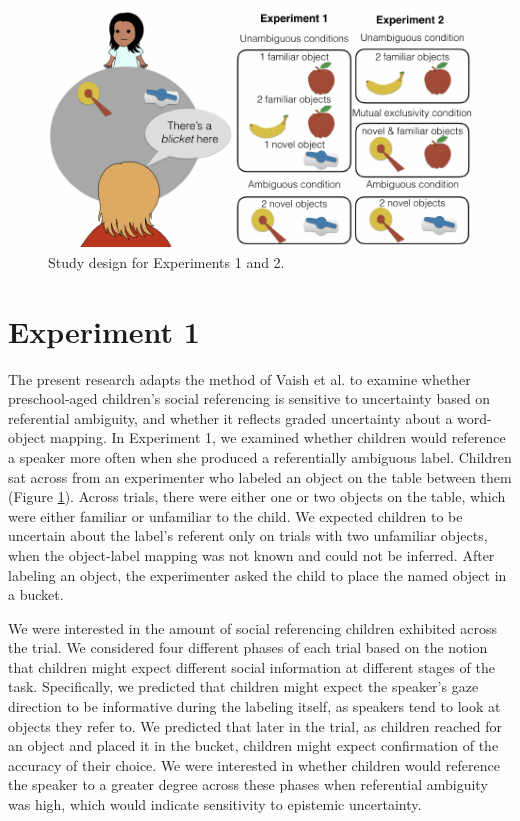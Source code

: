 \documentclass[10pt, letterpaper]{article}
\newenvironment{CodeChunk}{}{}
\begin{document}
\begin{CodeChunk}
\captionsetup{width=0.8\columnwidth}\begin{figure}[h]

{\centering \includegraphics{figs/design-1} 

}

\caption[Study design for Experiments 1 and 2]{Study design for Experiments 1 and 2.}\label{fig:design}
\end{figure}
\end{CodeChunk}

\section{Experiment 1}\label{experiment-1}

The present research adapts the method of Vaish et al. to examine
whether preschool-aged children's social referencing is sensitive to
uncertainty based on referential ambiguity, and whether it reflects
graded uncertainty about a word-object mapping. In Experiment 1, we
examined whether children would reference a speaker more often when she
produced a referentially ambiguous label. Children sat across from an
experimenter who labeled an object on the table between them (Figure
\ref{fig:design}). Across trials, there were either one or two objects
on the table, which were either familiar or unfamiliar to the child. We
expected children to be uncertain about the label's referent only on
trials with two unfamiliar objects, when the object-label mapping was
not known and could not be inferred. After labeling an object, the
experimenter asked the child to place the named object in a bucket.

We were interested in the amount of social referencing children
exhibited across the trial. We considered four different phases of each
trial based on the notion that children might expect different social
information at different stages of the task. Specifically, we predicted
that children might expect the speaker's gaze direction to be
informative during the labeling itself, as speakers tend to look at
objects they refer to. We predicted that later in the trial, as children
reached for an object and placed it in the bucket, children might expect
confirmation of the accuracy of their choice. We were interested in
whether children would reference the speaker to a greater degree across
these phases when referential ambiguity was high, which would indicate
sensitivity to epistemic uncertainty.
\end{document}
